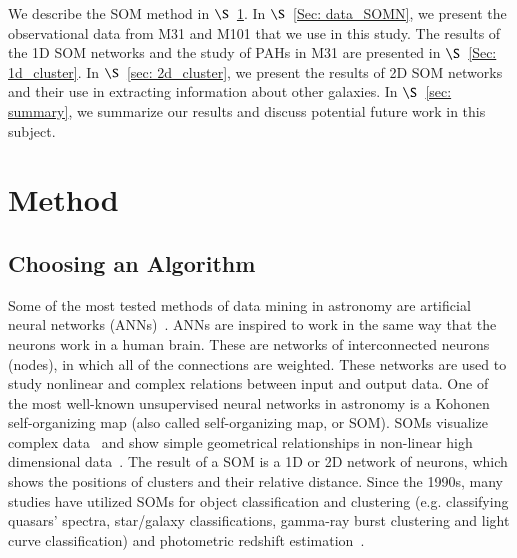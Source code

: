 We describe the SOM method in $\S$~\ref{sec: method_SOMN}. 
In $\S$~\ref{Sec: data_SOMN}, we present the observational data from M31 and M101 that we use in this study.
The results of the 1D SOM networks and the study of PAHs in M31 are presented in $\S$~\ref{Sec: 1d_cluster}.
In $\S$~\ref{sec: 2d_cluster}, we present the results of 2D SOM networks and their use in extracting information about other galaxies.
In $\S$~\ref{sec: summary}, we summarize our results and discuss potential future work in this subject.
\section{Method}
\label{sec: method_SOMN}
\subsection{Choosing an Algorithm}

Some of the most tested methods of data mining in astronomy are artificial neural networks (ANNs)~\citep[e.g.][and references therein]{Hossein14,Hossein16}.
ANNs are inspired to work in the same way that the neurons work in a human brain.
These are networks of interconnected neurons (nodes), in which all of the connections are weighted.
These networks are used to study nonlinear and complex relations between input and output data.
One of the most well-known unsupervised neural networks in astronomy is a Kohonen self-organizing map (also called self-organizing map, or SOM).
SOMs visualize complex data~\citep{Kohonen82} and show simple geometrical relationships in non-linear high dimensional data~\citep{Kohonen98}.
The result of a SOM is a 1D or 2D network of neurons, which shows the positions of clusters and their relative distance.
Since the 1990s, many studies have utilized SOMs for object classification and clustering (e.g. classifying quasars' spectra, star/galaxy classifications, gamma-ray burst clustering and light curve classification) and photometric redshift estimation~\citep[e.g.][]{Odewahn92, Hernandez94, Murtagh95, Maehoenen95,Scaringi09,Geach12,Fustes13,Meusinger16}.

